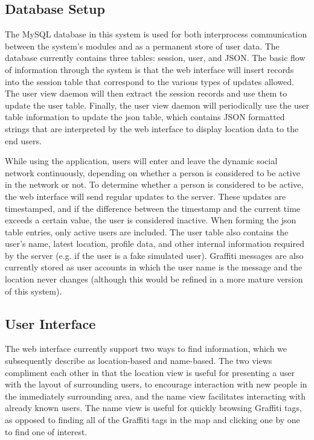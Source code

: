 \documentclass[11pt]{article}
\begin{document}
\subsection{Database Setup}


The MySQL database in this system is used for both interprocess communication
between the system's modules and as a permanent store of user data. The database
currently contains three tables: session, user, and JSON. The basic flow of 
information through the system is that the web interface will insert
records into the session table that correspond to the various types of
updates allowed. The user view daemon will then extract the session records
and use them to update the user table. Finally, the user view daemon will
periodically use the user table information to update the json table, which
contains JSON formatted \cite{json} strings that are interpreted by the web interface
to display location data to the end users.

While using the application, users will enter and leave the dynamic
social network continuously, depending on whether a person is considered
to be active in the network or not. To determine whether a person is
considered to be active, the web interface will send regular updates
to the server. These updates are timestamped, and if the difference
between the timestamp and the current time exceeds a certain value, the
user is considered inactive. When forming the json table entries, only
active users are included. The user table also contains the user's name,
latest location, profile data, and other internal information required
by the server (e.g. if the user is a fake simulated user). Graffiti messages
are also currently stored as user accounts in which the user name is the
message and the location never changes (although this would be refined in
a more mature version of this system).

 

\subsection{User Interface}

The web interface currently support two ways to find information, which
we subsequently describe as location-based and name-based. The two views
compliment each other in that the location view is useful for presenting
a user with the layout of surrounding users, to encourage interaction
with new people in the immediately surrounding area, and the name view
facilitates interacting with already known users. The name view is useful
for quickly browsing Graffiti tags, as opposed to finding all of the
Graffiti tags in the map and clicking one by one to find one of interest.
\end{document}
